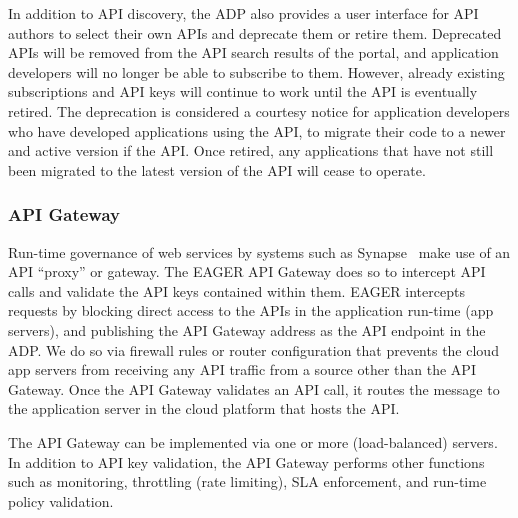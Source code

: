 In addition to API discovery, the ADP also provides a user
interface for API authors to select their own APIs and deprecate them or
retire them. Deprecated APIs will be removed from the API search
results of the portal, and application developers will no longer be able to 
subscribe to them. However, already existing subscriptions and API keys will continue
to work until the API is eventually retired. 
The deprecation is considered a courtesy notice for application developers
who have developed applications using the API, to migrate their code to a newer and active version
if the API. 
Once retired, any applications that have
not still been migrated to the latest version of the API will cease to operate.

\subsubsection{API Gateway} 
Run-time governance of web services by systems such as
Synapse~\cite{synapse} make use of an API ``proxy'' or gateway.
The EAGER API Gateway does so to intercept API calls and validate 
the API keys contained within them.
EAGER intercepts requests by blocking direct access to the APIs in the
application run-time (app servers), and publishing the API Gateway address as
the API endpoint in the ADP. We do so via firewall rules
or router configuration that prevents the cloud app servers from receiving any
API traffic from a source other than the API Gateway. Once the API Gateway validates
an API call, it routes the message to the
application server in the cloud platform that hosts the API.

The API Gateway can be implemented via one or more (load-balanced) servers.
In addition to API key validation, the API Gateway performs other
functions such as monitoring, throttling (rate limiting), SLA
enforcement, and run-time policy validation. 
